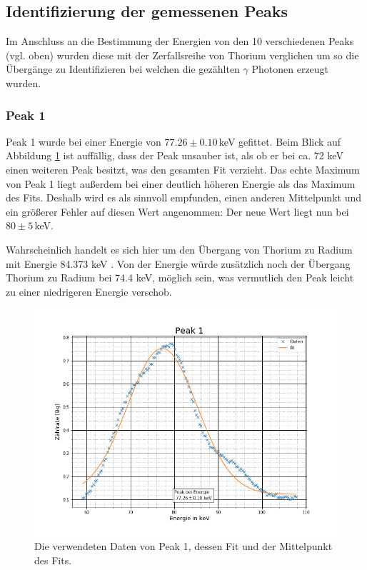 \subsection{Identifizierung der gemessenen Peaks}
Im Anschluss an die Bestimmung der Energien von den 10 verschiedenen Peaks (vgl. oben) wurden diese mit der Zerfallsreihe von Thorium verglichen um so die Übergänge zu Identifizieren bei welchen die gezählten $\gamma$ Photonen erzeugt wurden.
\subsubsection{Peak 1}
Peak 1 wurde bei einer Energie von $77.26\pm0.10\,$keV gefittet. 
Beim Blick auf Abbildung \ref{p1} ist auffällig, dass der Peak unsauber ist, als ob er bei ca. 72 keV einen weiteren Peak besitzt, was den gesamten Fit verzieht. Das echte Maximum von Peak 1 liegt außerdem bei einer deutlich höheren Energie als das Maximum des Fits. Deshalb wird es als sinnvoll empfunden, einen anderen Mittelpunkt und ein größerer Fehler auf diesen Wert angenommen: Der neue Wert liegt nun bei $80\pm5\,$keV.\par
Wahrscheinlich handelt es sich hier um den Übergang von Thorium zu Radium mit Energie 84.373 keV \cite{Thorium}. Von der Energie würde zusätzlich noch der Übergang Thorium zu Radium bei 74.4 keV, möglich sein, was vermutlich den Peak leicht zu einer niedrigeren Energie verschob.
\begin{figure}[h]
	\centering
	\includegraphics[scale=0.7]{Bilder/Anhang/P1}
	\caption[Thorium Peak 1]{\small Die verwendeten Daten von Peak 1, dessen Fit und der Mittelpunkt des Fits.}
	\label{p1}
\end{figure}
\FloatBarrier
